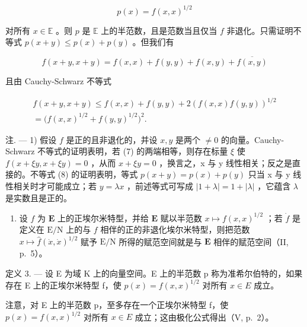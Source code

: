 \[
p (x) = f (x, x) ^ {1 / 2}
\]

对所有 \(x \in \mathbb{E}\) 。则 \(p\) 是 \(\mathbb{E}\) 上的半范数，且是范数当且仅当 \(f\) 非退化。只需证明不等式 \(p(x + y) \leqslant p(x) + p(y)\) 。但我们有

\[
f (x + y, x + y) = f (x, x) + f (y, y) + f (x, y) + \overline {{f (x , y)}}
\]

且由 Cauchy-Schwarz 不等式

\[
\begin{array}{c} f (x + y, x + y) \leqslant f (x, x) + f (y, y) + 2 (f (x, x) f (y, y)) ^ {1 / 2} \\ = \bigl (f (x, x) ^ {1 / 2} + f (y, y) ^ {1 / 2} \bigr) ^ {2}. \end{array}\tag{8}
\]

注. --- 1) 假设 \(f\) 是正的且非退化的，并设 \(x, y\) 是两个 \(\neq 0\) 的向量。Cauchy-Schwarz 不等式的证明表明，若 (7) 的两端相等，则存在标量 \(\xi\) 使 \(f(x + \xi y, x + \xi y) = 0\) ，从而 \(x + \xi y = 0\) ，换言之，x 与 y 线性相关；反之是直接的。不等式 (8) 的证明表明，等式 \(p(x + y) = p(x) + p(y)\) 只当 x 与 y 线性相关时才可能成立；若 \(y = \lambda x\) ，前述等式可写成 \(|1 + \lambda| = 1 + |\lambda|\) ，它蕴含 \(\lambda\) 是实数且是正的。

\begin{enumerate}
\def\labelenumi{\arabic{enumi})}
\setcounter{enumi}{1}
\tightlist
\item
  设 \(f\) 为 \(\mathbf{E}\) 上的正埃尔米特型，并给 \(\mathbf{E}\) 赋以半范数 \(x \mapsto f(x, x)^{1/2}\) ；若 \(\dot{f}\) 是定义在 \(\mathrm{E/N}\) 上的与 \(f\) 相伴的正的非退化埃尔米特型，则把范数 \(x \mapsto \hat{f}(\dot{x}, \dot{x})^{1/2}\) 赋予 \(\mathrm{E/N}\) 所得的赋范空间就是与 \(\mathbf{E}\) 相伴的赋范空间（II, p.~5）。
\end{enumerate}

定义 3. --- 设 E 为域 K 上的向量空间。E 上的半范数 p 称为准希尔伯特的，如果存在 E 上的正埃尔米特型 f，使 \(p(x) = f(x, x)^{1/2}\) 对所有 \(x \in E\) 成立。

注意，对 E 上的半范数 p，至多存在一个正埃尔米特型 f，使 \(p(x) = f(x, x)^{1/2}\) 对所有 \(x \in E\) 成立；这由极化公式得出（V, p.~2）。

